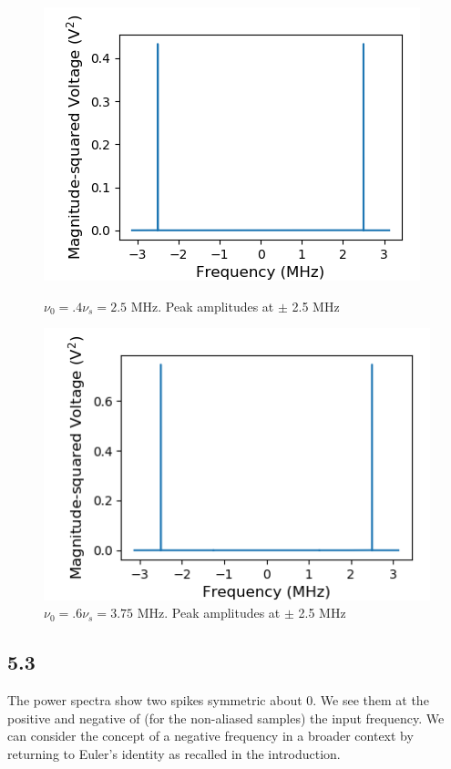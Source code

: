 \documentclass[a4paper]{article}
\begin{document}
\begin{figure}
\centering
\begin{minipage}{.5\textwidth}
	\centering
	\includegraphics[width=.8\linewidth]{5-2/pow4}
	\caption{$\nu_0 = .4 \nu_s = 2.5$ MHz. Peak amplitudes at $\pm$ 2.5 MHz}
	\label{fig:NyPw4}
\end{minipage}%
\begin{minipage}{.5\textwidth}
	\centering
	\includegraphics[width=.8\linewidth]{5-2/pow6}
	\caption{$\nu_0 = .6 \nu_s = 3.75$ MHz. Peak amplitudes at $\pm$ 2.5 MHz}
	\label{fig:NyPw6}
\end{minipage}
\end{figure}

\subsection{5.3}

The power spectra show two spikes symmetric about 0. We see them at the positive and negative of (for the non-aliased samples) the input frequency. We can consider the concept of a negative frequency in a broader context by returning to Euler's identity as recalled in the introduction.
\end{document}
